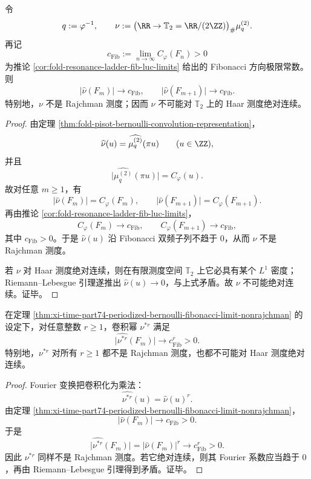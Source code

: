 \begin{theorem}\label{thm:xi-time-part74-periodized-bernoulli-fibonacci-limit-nonrajchman}
令
\[
q:=\varphi^{-1},
\qquad
\nu:=\bigl(\RR\to \mathbb T_2=\RR/(2\ZZ)\bigr)_\#\mu_q^{(2)}.
\]
再记
\[
c_{\mathrm{Fib}}:=\lim_{n\to\infty}C_\varphi(F_n)>0
\]
为推论 \ref{cor:fold-resonance-ladder-fib-luc-limits} 给出的 Fibonacci 方向极限常数。则
\[
\bigl|\widehat \nu(F_m)\bigr|\longrightarrow c_{\mathrm{Fib}},
\qquad
\bigl|\widehat \nu(F_{m+1})\bigr|\longrightarrow c_{\mathrm{Fib}}.
\]
特别地，\(\nu\) 不是 Rajchman 测度；因而 \(\nu\) 不可能对 \(\mathbb T_2\) 上的 Haar 测度绝对连续。
\end{theorem}
\begin{proof}
由定理 \ref{thm:fold-pisot-bernoulli-convolution-representation}，
\[
\widehat \nu(u)=\widehat{\mu_q^{(2)}}(\pi u)
\qquad (u\in \ZZ),
\]
并且
\[
\bigl|\widehat{\mu_q^{(2)}}(\pi u)\bigr|=C_\varphi(u).
\]
故对任意 \(m\ge 1\)，有
\[
\bigl|\widehat \nu(F_m)\bigr|=C_\varphi(F_m),
\qquad
\bigl|\widehat \nu(F_{m+1})\bigr|=C_\varphi(F_{m+1}).
\]
再由推论 \ref{cor:fold-resonance-ladder-fib-luc-limits}，
\[
C_\varphi(F_m)\to c_{\mathrm{Fib}},
\qquad
C_\varphi(F_{m+1})\to c_{\mathrm{Fib}},
\]
其中 \(c_{\mathrm{Fib}}>0\)。于是 \(\widehat \nu(u)\) 沿 Fibonacci 双频子列不趋于 \(0\)，从而 \(\nu\) 不是 Rajchman 测度。

若 \(\nu\) 对 Haar 测度绝对连续，则在有限测度空间 \(\mathbb T_2\) 上它必具有某个 \(L^1\) 密度；Riemann--Lebesgue 引理遂推出 \(\widehat \nu(u)\to 0\)，与上式矛盾。故 \(\nu\) 不可能绝对连续。证毕。
\end{proof}

\begin{corollary}[周期化临界测度全部卷积幂的共振刚性]\label{cor:xi-time-part74-periodized-bernoulli-convolution-powers-nonrajchman}
在定理 \ref{thm:xi-time-part74-periodized-bernoulli-fibonacci-limit-nonrajchman} 的设定下，对任意整数 \(r\ge 1\)，卷积幂 \(\nu^{*r}\) 满足
\[
\bigl|\widehat{\nu^{*r}}(F_m)\bigr|
\longrightarrow
c_{\mathrm{Fib}}^r>0.
\]
特别地，\(\nu^{*r}\) 对所有 \(r\ge 1\) 都不是 Rajchman 测度，也都不可能对 Haar 测度绝对连续。
\end{corollary}
\begin{proof}
Fourier 变换把卷积化为乘法：
\[
\widehat{\nu^{*r}}(u)=\widehat \nu(u)^r.
\]
由定理 \ref{thm:xi-time-part74-periodized-bernoulli-fibonacci-limit-nonrajchman}，
\[
\bigl|\widehat \nu(F_m)\bigr|\to c_{\mathrm{Fib}}>0.
\]
于是
\[
\bigl|\widehat{\nu^{*r}}(F_m)\bigr|
=
\bigl|\widehat \nu(F_m)\bigr|^r
\longrightarrow
c_{\mathrm{Fib}}^r>0.
\]
因此 \(\nu^{*r}\) 同样不是 Rajchman 测度。若它绝对连续，则其 Fourier 系数应当趋于 \(0\)，再由 Riemann--Lebesgue 引理得到矛盾。证毕。
\end{proof}

